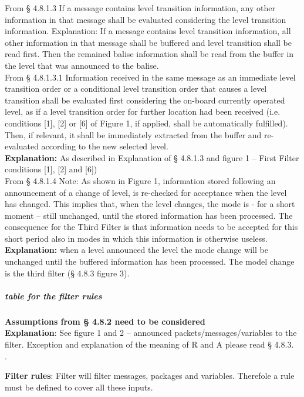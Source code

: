 From § 4.8.1.3 If a message contains level transition information, any other information in that message shall be evaluated considering the level transition information. Explanation: If a message contains level transition information, all other information in that message shall be buffered and level transition shall be read first. Then the remained balise information shall be read from the buffer in the level that was announced to the balise.\\

From § 4.8.1.3.1 Information received in the same message as an immediate level transition order or a conditional level transition order that causes a level transition shall be evaluated first considering the on-board currently operated level, as if a level transition order for further location had been received (i.e. conditions [1], [2] or [6] of Figure 1, if applied, shall be automatically fulfilled). Then, if relevant, it shall be immediately extracted from the buffer and re-evaluated according to the new selected level.\\
\textbf{Explanation:} As described in Explanation of § 4.8.1.3 and figure 1 – First Filter conditions [1], [2] and [6])\\

From § 4.8.1.4 Note: As shown in Figure 1, information stored following an announcement of a change of level, is re-checked for acceptance when the level has changed. This implies that, when the level changes, the mode is - for a short moment – still unchanged, until the stored information has been processed. The consequence for the Third Filter is that information needs to be accepted for this short period also in modes in which this information is otherwise useless.\\
\textbf{Explanation:} when a level announced the level the mode change will be unchanged until the buffered information has been processed. The model change is the third filter (§ 4.8.3 figure 3).\\

\subparagraph{table for the filter rules}
\textbf{Assumptions from § 4.8.2 need to be considered}\\
\textbf{Explanation}: See figure 1 and 2 – announced packets/messages/variables to the filter. Exception and explanation of the meaning of R and A please read § 4.8.3.\\. 

\textbf {Filter rules}: Filter will filter messages, packages and variables. Therefole a rule must be defined to cover all these inputs.\\

